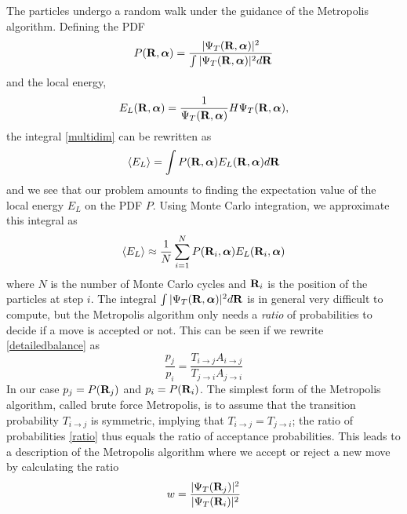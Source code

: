 \documentclass[english, a4paper]{article}
\begin{document}
\noindent The particles undergo a random walk under the guidance of the Metropolis algorithm. 
Defining the PDF 
\begin{equation}
 P({\bf R}, \boldsymbol{\alpha}) = \frac{|\Psi_T({\bf R},\boldsymbol{\alpha})
 |^2}{\int |\Psi_T({\bf R}, \boldsymbol{\alpha})|^2 d{\bf R}}
\end{equation}
and the local energy,
\begin{equation}
    E_L({\bf R, \boldsymbol{\alpha}})=\frac{1}{\Psi_T({\bf R, \boldsymbol{\alpha}})}H
    \Psi_T({\bf R}, \boldsymbol{\alpha}),
    \label{localEnergy}
 \end{equation}
the integral \eqref{multidim} can be rewritten as
\begin{equation}
 \langle E_L \rangle = \int P({\bf R}, \boldsymbol{\alpha}) E_L({\bf R}, \boldsymbol{\alpha}) d{\bf R}
 \label{localEnergyExp}
\end{equation}
and we see that our problem amounts to finding the expectation value of the local energy $E_L$ on the PDF $P$.
Using Monte Carlo integration, we approximate this integral as
\begin{equation}
 \langle E_L \rangle \approx \frac{1}{N} \sum_{i=1}^N P({\bf R}_i, \boldsymbol{\alpha}) E_L({\bf R}_i, 
 \boldsymbol{\alpha})
\end{equation}
where $N$ is the number of Monte Carlo cycles and ${\bf R}_i$ is the position of the particles at step $i$. 
The integral $\int |\Psi_T({\bf R}, \boldsymbol{\alpha})|^2 d{\bf R}$ is in general very difficult to compute, 
but the Metropolis algorithm only needs
a \textit{ratio} of probabilities to decide if a move is accepted or not. This can be seen if we rewrite 
\eqref{detailedbalance} as
\begin{equation}
 \frac{p_j}{p_i} = \frac{T_{i\rightarrow j} A_{i\rightarrow j}}{T_{j\rightarrow i} A_{j\rightarrow i}}
 \label{ratio}
\end{equation}
In our case $p_j = P({\bf R}_j)$ and $p_i = P({\bf R}_i)$. 
The simplest form of the Metropolis algorithm, called brute force Metropolis, is to assume that
the transition probability $T_{i\rightarrow j}$ is symmetric, implying that $T_{i\rightarrow j} = T_{j\rightarrow i}$;
the ratio of probabilities \eqref{ratio} thus equals the ratio of acceptance probabilities. 
This leads to a  description of the Metropolis algorithm where we accept or reject a new 
move by calculating the ratio 
\begin{equation}
 w = \frac{|\Psi_T({\bf R}_j)|^2}{|\Psi_T({\bf R}_i)|^2}
 \label{metropolisRatio}
\end{equation}
\end{document}
